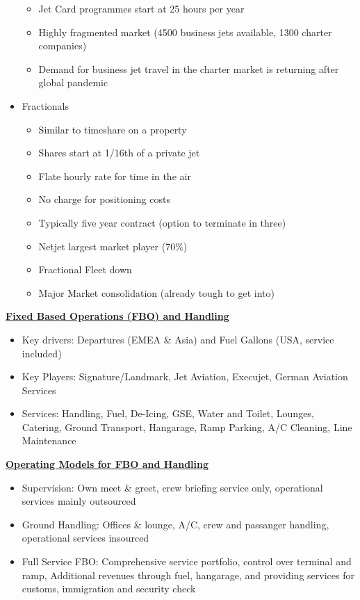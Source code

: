 \documentclass[9pt, landscape, fleqn]{scrartcl}
\begin{document}
\begin{multicols*}{3}
\begin{itemize}
\begin{itemize}
        \item Jet Card programmes start at 25 hours per year
        \item Highly fragmented market (4500 business jets available, 1300 charter companies)
        \item Demand for business jet travel in the charter market is returning after global pandemic  
    \end{itemize} 
    \item Fractionals 
    \begin{itemize}
        \item Similar to timeshare on a property 
        \item Shares start at 1/16th of a private jet 
        \item Flate hourly rate for time in the air 
        \item No charge for positioning costs 
        \item Typically five year contract (option to terminate in three)
        \item Netjet largest market player (70\%)
        \item Fractional Fleet down 
        \item Major Market consolidation (already tough to get into)
    \end{itemize}
\end{itemize}
\underline{\textbf{Fixed Based Operations (FBO) and Handling}}
\begin{itemize}
    \item Key drivers: Departures (EMEA \& Asia) and Fuel Gallons (USA, service included)
    \item Key Players: Signature/Landmark, Jet Aviation, Execujet, German Aviation Services
    \item Services: Handling, Fuel, De-Icing, GSE, Water and Toilet, Lounges, Catering, Ground Transport, Hangarage, Ramp Parking, A/C Cleaning, Line Maintenance
\end{itemize}
\underline{\textbf{Operating Models for FBO and Handling}}
\begin{itemize}
    \item Supervision: Own meet \& greet, crew briefing service only, operational services mainly outsourced 
    \item Ground Handling: Offices \& lounge, A/C, crew and passanger handling, operational services insourced
    \item Full Service FBO: Comprehensive service portfolio, control over terminal and ramp, Additional revenues through fuel, hangarage, and providing services for customs, immigration and security check 

\end{itemize}
\end{multicols*}
\end{document}
